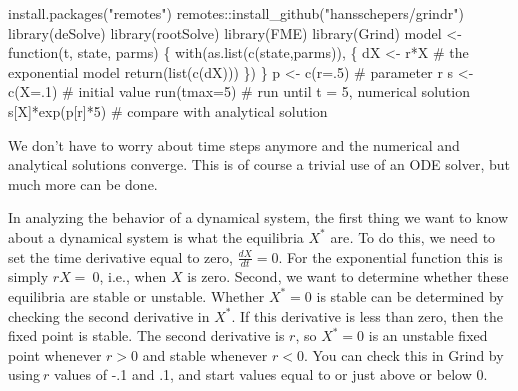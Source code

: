 \documentclass[
  a4paper,
  DIV=11,
  numbers=noendperiod,
  oneside]{scrreprt}
\newenvironment{Shaded}{\begin{snugshade}}{\end{snugshade}}
\newcommand{\AttributeTok}[1]{\textcolor[rgb]{0.40,0.45,0.13}{#1}}
\newcommand{\CommentTok}[1]{\textcolor[rgb]{0.37,0.37,0.37}{#1}}
\newcommand{\ControlFlowTok}[1]{\textcolor[rgb]{0.00,0.23,0.31}{#1}}
\newcommand{\DecValTok}[1]{\textcolor[rgb]{0.68,0.00,0.00}{#1}}
\newcommand{\FunctionTok}[1]{\textcolor[rgb]{0.28,0.35,0.67}{#1}}
\newcommand{\NormalTok}[1]{\textcolor[rgb]{0.00,0.23,0.31}{#1}}
\newcommand{\OtherTok}[1]{\textcolor[rgb]{0.00,0.23,0.31}{#1}}
\newcommand{\SpecialCharTok}[1]{\textcolor[rgb]{0.37,0.37,0.37}{#1}}
\newcommand{\StringTok}[1]{\textcolor[rgb]{0.13,0.47,0.30}{#1}}
\begin{document}
\begin{Shaded}
\begin{Highlighting}[]
\FunctionTok{install.packages}\NormalTok{(}\StringTok{"remotes"}\NormalTok{)}
\NormalTok{remotes}\SpecialCharTok{::}\FunctionTok{install\_github}\NormalTok{(}\StringTok{"hansschepers/grindr"}\NormalTok{)}
\FunctionTok{library}\NormalTok{(deSolve)}
\FunctionTok{library}\NormalTok{(rootSolve)}
\FunctionTok{library}\NormalTok{(FME)}
\FunctionTok{library}\NormalTok{(Grind)}
\NormalTok{model }\OtherTok{\textless{}{-}} \ControlFlowTok{function}\NormalTok{(t, state, parms) \{}
  \FunctionTok{with}\NormalTok{(}\FunctionTok{as.list}\NormalTok{(}\FunctionTok{c}\NormalTok{(state,parms)), \{}
\NormalTok{    dX }\OtherTok{\textless{}{-}}\NormalTok{ r}\SpecialCharTok{*}\NormalTok{X            }\CommentTok{\# the exponential model}
      \FunctionTok{return}\NormalTok{(}\FunctionTok{list}\NormalTok{(}\FunctionTok{c}\NormalTok{(dX)))}
\NormalTok{  \})}
\NormalTok{\}}
\NormalTok{p }\OtherTok{\textless{}{-}} \FunctionTok{c}\NormalTok{(}\AttributeTok{r=}\NormalTok{.}\DecValTok{5}\NormalTok{) }\CommentTok{\# parameter r}
\NormalTok{s }\OtherTok{\textless{}{-}} \FunctionTok{c}\NormalTok{(}\AttributeTok{X=}\NormalTok{.}\DecValTok{1}\NormalTok{) }\CommentTok{\# initial value}
\FunctionTok{run}\NormalTok{(}\AttributeTok{tmax=}\DecValTok{5}\NormalTok{) }\CommentTok{\# run until t = 5, numerical solution}
\NormalTok{s[}\StringTok{\textquotesingle{}X\textquotesingle{}}\NormalTok{]}\SpecialCharTok{*}\FunctionTok{exp}\NormalTok{(p[}\StringTok{\textquotesingle{}r\textquotesingle{}}\NormalTok{]}\SpecialCharTok{*}\DecValTok{5}\NormalTok{) }\CommentTok{\# compare with analytical solution}
\end{Highlighting}
\end{Shaded}

We don't have to worry about time steps anymore and the numerical and
analytical solutions converge. This is of course a trivial use of an ODE
solver, but much more can be done.

In analyzing the behavior of a dynamical system, the first thing we want
to know about a dynamical system is what the equilibria \(X^{*}\)
are\emph{.} To do this, we need to set the time derivative equal to
zero, \(\frac{dX}{dt} = 0\). For the exponential function this is simply
\(rX = \ 0\), i.e., when \(X\) is zero. Second, we want to determine
whether these equilibria are stable or unstable. Whether \(X^{*}=0\) is
stable can be determined by checking the second derivative in \(X^{*}\).
If this derivative is less than zero, then the fixed point is stable.
The second derivative is \(r\), so \(X^{*} = 0\) is an unstable fixed
point whenever \(r > 0\) and stable whenever \(r < 0\). You can check
this in Grind by using\(\ r\) values of -.1 and .1, and start values
equal to or just above or below 0.
\end{document}
